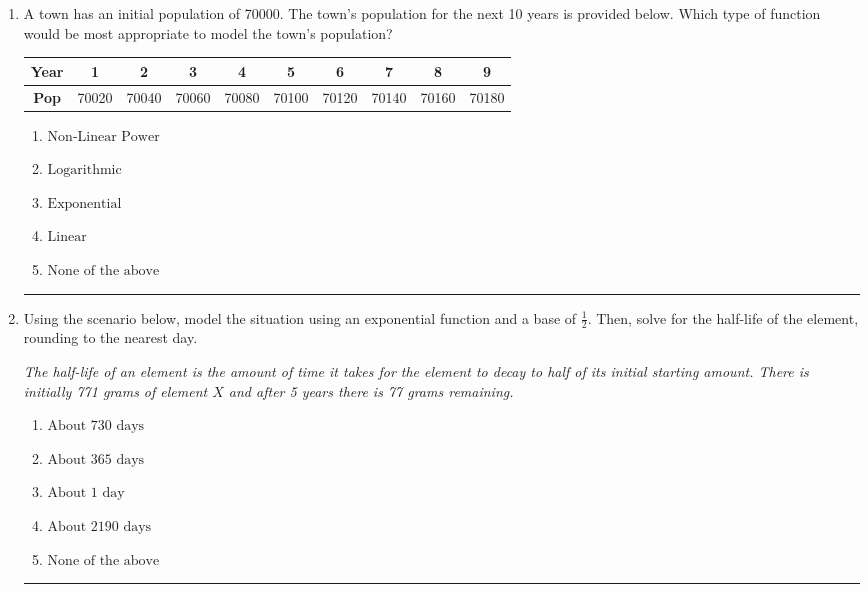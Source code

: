 \documentclass[14pt]{extbook}
\newcommand{\litem}[1]{\item#1\hspace*{-1cm}\rule{\textwidth}{0.4pt}}
\begin{document}
\begin{enumerate}
\litem{
A town has an initial population of 70000. The town's population for the next 10 years is provided below. Which type of function would be most appropriate to model the town's population?

\begin{tabular}{c|c|c|c|c|c|c|c|c|c}
\textbf{Year} &1 &2 &3 &4 &5 &6 &7 &8 &9\tabularnewline \hline
\textbf{Pop} &70020 &70040 &70060 &70080 &70100 &70120 &70140 &70160 &70180\end{tabular}\begin{enumerate}[label=\Alph*.]
\item \( \text{Non-Linear Power} \)
\item \( \text{Logarithmic} \)
\item \( \text{Exponential} \)
\item \( \text{Linear} \)
\item \( \text{None of the above} \)

\end{enumerate} }
\litem{
Using the scenario below, model the situation using an exponential function and a base of $\frac{1}{2}$. Then, solve for the half-life of the element, rounding to the nearest day.
\begin{center}
    \textit{ The half-life of an element is the amount of time it takes for the element to decay to half of its initial starting amount. There is initially 771 grams of element $X$ and after 5 years there is 77 grams remaining. }
\end{center}
\begin{enumerate}[label=\Alph*.]
\item \( \text{About } 730 \text{ days} \)
\item \( \text{About } 365 \text{ days} \)
\item \( \text{About } 1 \text{ day} \)
\item \( \text{About } 2190 \text{ days} \)
\item \( \text{None of the above} \)


\end{enumerate}}
\end{enumerate}
\end{document}
